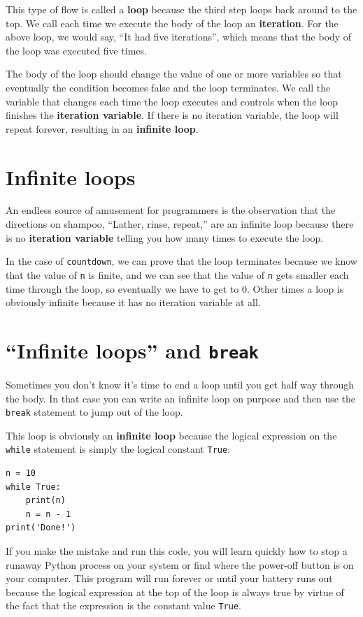 This type of flow is called a {\bf loop} because the third step
loops back around to the top.  We call each time we execute the body of 
the loop an {\bf iteration}.  For the above loop, we 
would say, ``It had five iterations'', which means that the body of
the loop was executed five times.


The body of the loop should change the value of one or more variables
so that eventually the condition becomes false and the loop
terminates.  
We call the variable that changes each time the loop
executes and controls when the loop finishes the 
{\bf iteration variable}.
If there is no iteration variable, the loop will repeat forever, 
resulting in an {\bf infinite loop}.  

\section{Infinite loops}

An endless source of amusement for 
programmers is the observation that the directions on shampoo,
``Lather, rinse, repeat,'' are an infinite loop because 
there is no {\bf iteration variable} telling you how many times
to execute the loop.


In the case of {\tt countdown}, we can prove that the loop
terminates because we know that the value of {\tt n} is finite, and we
can see that the value of {\tt n} gets smaller each time through the
loop, so eventually we have to get to 0.  Other times a loop is obviously
infinite because it has no iteration variable at all.

\section{``Infinite loops'' and {\tt break}}

Sometimes you don't know it's time to end a loop until you get half
way through the body.  In that case you can write an infinite loop on purpose
and then use the {\tt break} statement to jump out of the loop.

This loop is obviously an {\bf infinite loop} because the logical 
expression on the
{\tt while} statement is simply the logical constant {\tt True}:

\beforeverb
\begin{verbatim}
n = 10
while True:
    print(n) 
    n = n - 1
print('Done!')
\end{verbatim}
\afterverb
%
If you make the mistake and run this code, you will learn quickly how
to stop a runaway Python process on your system or find where the power-off
button is on your computer.  
This program will 
run forever or until your battery runs out 
because the logical expression at the top of the loop 
is always true by virtue of the fact that the expression is the 
constant value {\tt True}.

